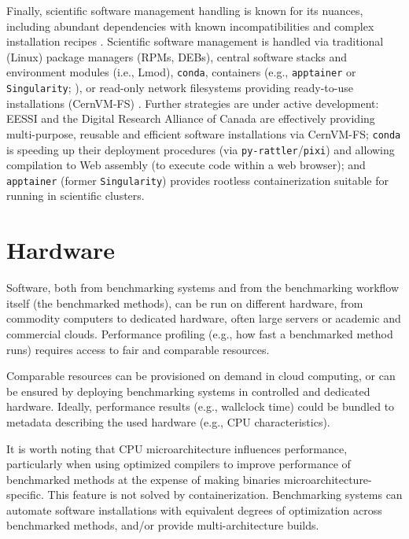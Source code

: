 \documentclass[11pt]{article}
\begin{document}
Finally, scientific software management handling is known for its nuances, including abundant dependencies with known incompatibilities and complex installation recipes \cite{droge2023-ax}. Scientific software management is handled via traditional (Linux) package managers (RPMs, DEBs), central software stacks and environment modules (i.e., Lmod), \texttt{conda}, containers (e.g., \texttt{apptainer} or \texttt{Singularity}; \cite{Kurtzer2017-mn}), or read-only network filesystems providing ready-to-use installations (CernVM-FS) \cite{Blomer2013-jk}. Further strategies are under active development: EESSI \cite{droge2023-ax} and the Digital Research Alliance of Canada \cite{Boissonneault2019-wm} are effectively providing multi-purpose, reusable and efficient software installations via CernVM-FS; \texttt{conda} is speeding up their deployment procedures (via \texttt{py-rattler}/\texttt{pixi}) and allowing compilation to Web assembly (to execute code within a web browser); and \texttt{apptainer} (former \texttt{Singularity}) provides rootless containerization suitable for running in scientific clusters. 

\section*{Hardware}

Software, both from benchmarking systems and from the benchmarking workflow itself (the benchmarked methods), can be run on different hardware, from commodity computers to dedicated hardware, often large servers or academic and commercial clouds. Performance profiling (e.g., how fast a benchmarked method runs) requires access to fair and comparable resources. 

Comparable resources can be provisioned on demand in cloud computing, or can be ensured by deploying benchmarking systems in controlled and dedicated hardware. Ideally, performance results (e.g., wallclock time) could be bundled to metadata describing the used hardware (e.g., CPU characteristics).

It is worth noting that CPU microarchitecture influences performance, particularly when using optimized compilers to improve performance of benchmarked methods at the expense of making binaries microarchitecture-specific. This feature is not solved by containerization. Benchmarking systems can automate software installations with equivalent degrees of optimization across benchmarked methods, and/or provide multi-architecture builds.
\end{document}
